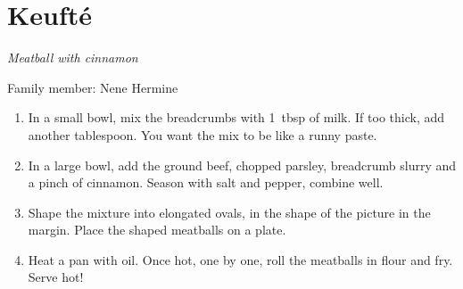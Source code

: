 \chapter{Keufté}
\label{ch:Keufte}


\textit{Meatball with cinnamon}

Family member: Nene Hermine

\begin{enumerate}
    \item In a small bowl, mix the breadcrumbs with 1~tbsp of milk. If too thick, add another tablespoon. You want the mix to be like a runny paste.
    \item In a large bowl, add the ground beef, chopped parsley, breadcrumb slurry and a pinch of cinnamon. Season with salt and pepper, combine well.
    \item Shape the mixture into elongated ovals, in the shape of the picture in the margin. Place the shaped meatballs on a plate.
    \item Heat a pan with oil. Once hot, one by one, roll the meatballs in flour and fry. Serve hot!
\end{enumerate}
